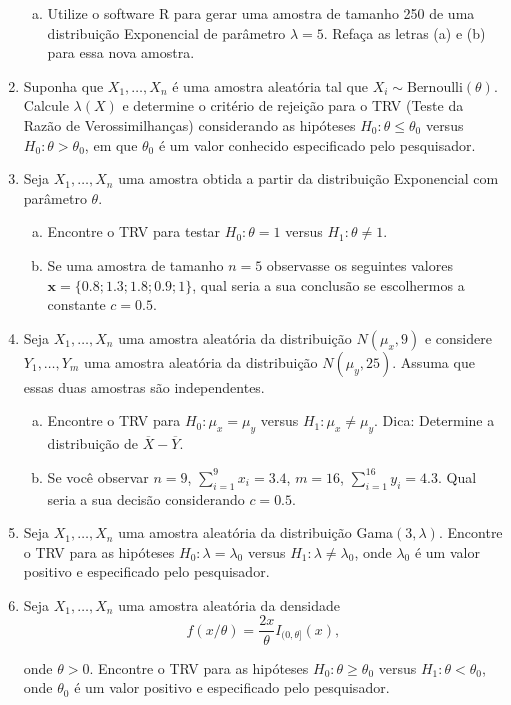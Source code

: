 \documentclass[10pt,brazil,addpoints]{exam}
\begin{document}
\begin{enumerate}[1.]
\begin{enumerate}[a)]
\item Utilize o software R para gerar uma amostra de tamanho 250 de uma distribuição Exponencial de parâmetro $\lambda=5$. Refaça as letras (a) e (b) para essa nova amostra.

\end{enumerate}

\item Suponha que $X_1, \ldots, X_n$ é uma amostra aleatória tal que $X_i \sim \mbox{Bernoulli}(\theta)$. Calcule $\lambda(X)$ e determine o critério de rejeição para o TRV (Teste da Razão de Verossimilhanças) considerando as hipóteses $H_0: \theta \leq \theta_0 $ versus $H_0: \theta > \theta_0 $, em que $\theta_0$ é um valor conhecido especificado pelo pesquisador.

\item Seja $X_1, \ldots, X_n$ uma amostra obtida a partir da distribuição Exponencial com parâmetro $\theta$.

\begin{enumerate}[a)]
\item Encontre o TRV para testar $H_0: \theta = 1$ versus $H_1: \theta \neq 1$.

\item Se uma amostra de tamanho $n=5$ observasse os seguintes valores $\textbf{x}=\{0.8; 1.3; 1.8; 0.9; 1\}$, qual seria a sua conclusão se escolhermos a constante $c=0.5$.

\end{enumerate}

\item Seja $X_1, \ldots, X_n$ uma amostra aleatória da distribuição $N(\mu_x, 9)$ e considere $Y_1, \ldots, Y_m$ uma amostra aleatória da distribuição $N(\mu_y, 25)$. Assuma que essas duas amostras são independentes.

\begin{enumerate}[a)]
\item Encontre o TRV para $H_0: \mu_x=\mu_y$ versus $H_1: \mu_x\neq \mu_y$. Dica: Determine a distribuição de $\overline{X}-\overline{Y}$.

\item Se você observar $n=9$, $\sum_{i=1}^9 x_i=3.4$, $m=16$, $\sum_{i=1}^{16} y_i=4.3$. Qual seria a sua decisão considerando $c=0.5$.
\end{enumerate}

\item Seja $X_1, \ldots, X_n$ uma amostra aleatória da distribuição Gama$(3, \lambda)$. Encontre o TRV para as hipóteses $H_0:\lambda=\lambda_0$ versus $H_1: \lambda \neq \lambda_0$, onde $\lambda_0$ é um valor positivo e especificado pelo pesquisador.

\item Seja $X_1, \ldots, X_n$ uma amostra aleatória da densidade
$$
f(x/\theta)=\frac{2x}{\theta}I_{(0, \theta]}(x),
$$

onde $\theta>0$.  Encontre o TRV para as hipóteses $H_0:\theta\geq\theta_0$ versus $H_1: \theta < \theta_0$, onde $\theta_0$ é um valor positivo e especificado pelo pesquisador.


\end{enumerate}
\end{document}
